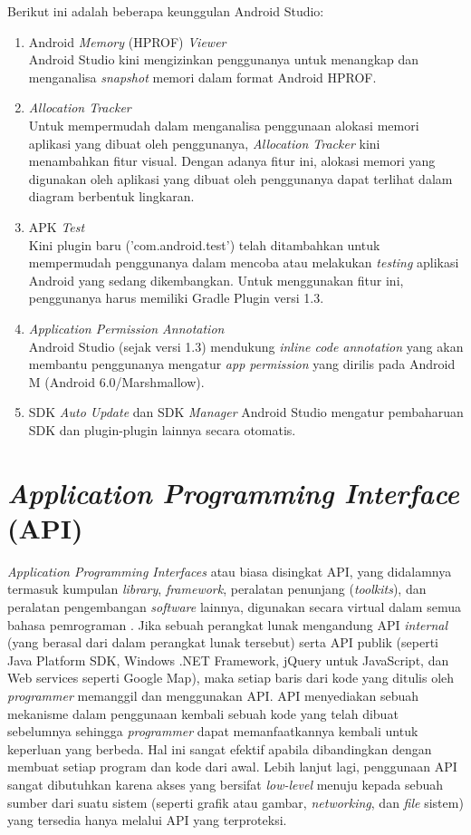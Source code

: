 	Berikut ini adalah beberapa keunggulan Android Studio:
	\begin{enumerate}
		\item Android \emph{Memory} (HPROF) \emph{Viewer}\\
		Android Studio kini mengizinkan penggunanya untuk menangkap dan menganalisa \emph{snapshot} memori dalam format Android HPROF.
		\item \emph{Allocation Tracker}\\
		Untuk mempermudah dalam menganalisa penggunaan alokasi memori aplikasi yang dibuat oleh penggunanya, \emph{Allocation Tracker} kini menambahkan fitur visual. Dengan adanya fitur ini, alokasi memori yang digunakan oleh aplikasi yang dibuat oleh penggunanya dapat terlihat dalam diagram berbentuk lingkaran.
		\item APK \emph{Test}\\
		Kini plugin baru ('com.android.test') telah ditambahkan untuk mempermudah penggunanya dalam mencoba atau melakukan \emph{testing} aplikasi Android yang sedang dikembangkan. Untuk menggunakan fitur ini, penggunanya harus memiliki Gradle Plugin versi 1.3.
		\item \emph{Application Permission Annotation}\\
		Android Studio (sejak versi 1.3) mendukung \emph{inline code annotation} yang akan membantu penggunanya mengatur \emph{app permission} yang dirilis pada Android M (Android 6.0/Marshmallow).
		\item SDK \emph{Auto Update} dan SDK \emph{Manager}
		Android Studio mengatur pembaharuan SDK dan plugin-plugin lainnya secara otomatis.
	\end{enumerate}

\section{\emph{Application Programming Interface} (API)}
	\emph{Application Programming Interfaces} atau biasa disingkat API, yang didalamnya termasuk kumpulan \emph{library}, \emph{framework}, peralatan penunjang (\emph{toolkits}), dan peralatan pengembangan \emph{software} lainnya, digunakan secara virtual dalam semua bahasa pemrograman \cite{myers}. Jika sebuah perangkat lunak mengandung API \emph{internal} (yang berasal dari dalam perangkat lunak tersebut) serta API publik (seperti Java Platform SDK, Windows .NET Framework, jQuery untuk JavaScript, dan Web services seperti Google Map), maka setiap baris dari kode yang ditulis oleh \emph{programmer} memanggil dan menggunakan API. API menyediakan sebuah mekanisme dalam penggunaan kembali sebuah kode yang telah dibuat sebelumnya sehingga \emph{programmer} dapat memanfaatkannya kembali untuk keperluan yang berbeda. Hal ini sangat efektif apabila dibandingkan dengan membuat setiap program dan kode dari awal. Lebih lanjut lagi, penggunaan API sangat dibutuhkan karena akses yang bersifat \emph{low-level} menuju kepada sebuah sumber dari suatu sistem (seperti grafik atau gambar, \emph{networking}, dan \emph{file} sistem) yang tersedia hanya melalui API yang terproteksi.
	
